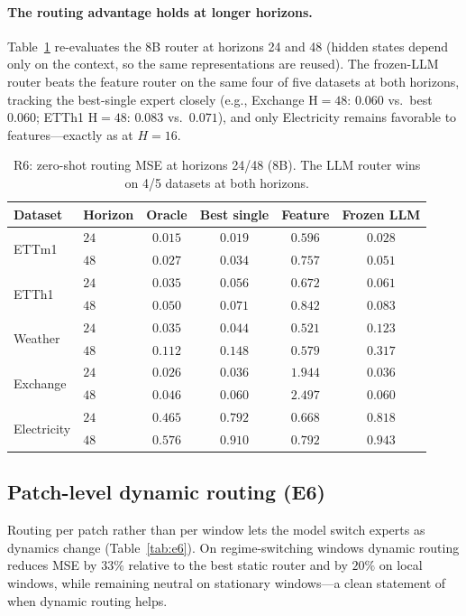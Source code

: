 \documentclass{article}
\begin{document}
\paragraph{The routing advantage holds at longer horizons.}
Table~\ref{tab:horizon} re-evaluates the $8$B router at horizons 24 and 48
(hidden states depend only on the context, so the same representations are
reused).  The frozen-LLM router beats the feature router on the same four of
five datasets at both horizons, tracking the best-single expert closely (e.g.,
Exchange H$=48$: $0.060$ vs.\ best $0.060$; ETTh1 H$=48$: $0.083$ vs.\ $0.071$),
and only Electricity remains favorable to features---exactly as at $H{=}16$.

\begin{table}[t]
\centering
\small
\begin{tabular}{llcccc}
\toprule
Dataset & Horizon & Oracle & Best single & Feature & Frozen LLM \\
\midrule
\multirow{2}{*}{ETTm1} & $24$ & $0.015$ & $0.019$ & $0.596$ & $\mathbf{0.028}$ \\
 & $48$ & $0.027$ & $0.034$ & $0.757$ & $\mathbf{0.051}$ \\
\multirow{2}{*}{ETTh1} & $24$ & $0.035$ & $0.056$ & $0.672$ & $\mathbf{0.061}$ \\
 & $48$ & $0.050$ & $0.071$ & $0.842$ & $\mathbf{0.083}$ \\
\multirow{2}{*}{Weather} & $24$ & $0.035$ & $0.044$ & $0.521$ & $\mathbf{0.123}$ \\
 & $48$ & $0.112$ & $0.148$ & $0.579$ & $\mathbf{0.317}$ \\
\multirow{2}{*}{Exchange} & $24$ & $0.026$ & $0.036$ & $1.944$ & $\mathbf{0.036}$ \\
 & $48$ & $0.046$ & $0.060$ & $2.497$ & $\mathbf{0.060}$ \\
\multirow{2}{*}{Electricity} & $24$ & $0.465$ & $0.792$ & $\mathbf{0.668}$ & $0.818$ \\
 & $48$ & $0.576$ & $0.910$ & $\mathbf{0.792}$ & $0.943$ \\
\bottomrule
\end{tabular}
\caption{R6: zero-shot routing MSE at horizons 24/48 (8B).  The LLM router
wins on 4/5 datasets at both horizons.}
\label{tab:horizon}
\end{table}

\subsection{Patch-level dynamic routing (E6)}
Routing per patch rather than per window lets the model switch experts as
dynamics change (Table~\ref{tab:e6}).  On regime-switching windows dynamic
routing reduces MSE by $33\%$ relative to the best static router and by $20\%$
on local windows, while remaining neutral on stationary windows---a clean
statement of when dynamic routing helps.
\end{document}
